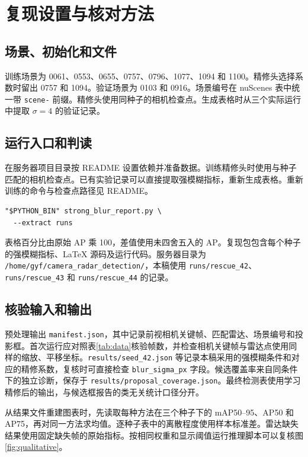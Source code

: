 \documentclass[conference,10pt,a4paper]{IEEEtran}
\begin{document}
\raggedbottom
\appendices
\section{复现设置与核对方法}
\subsection{场景、初始化和文件}
训练场景为 0061、0553、0655、0757、0796、1077、1094 和 1100。精修头选择系数时留出 0757 和 1094。验证场景为 0103 和 0916。场景编号在 nuScenes 表中统一带 \texttt{scene-} 前缀。精修头使用同种子的相机检查点。生成表格时从三个实际运行中提取 $\sigma=4$ 的验证记录。

\subsection{运行入口和判读}
在服务器项目目录按 README 设置依赖并准备数据。训练精修头时使用与种子匹配的相机检查点。已有实验记录可以直接提取强模糊指标，重新生成表格。重新训练的命令与检查点路径见 README。

\begin{small}
\begin{verbatim}
"$PYTHON_BIN" strong_blur_report.py \
  --extract runs
\end{verbatim}
\end{small}

表格百分比由原始 AP 乘 100，差值使用未四舍五入的 AP。复现包包含每个种子的强模糊指标、LaTeX 源码及运行代码。服务器目录为 \texttt{/home/gyf/}\allowbreak\texttt{camera\_radar\_detection/}，本稿使用 \texttt{runs/rescue\_42}、\texttt{runs/rescue\_43} 和 \texttt{runs/rescue\_44} 的记录。

\subsection{核验输入和输出}
预处理输出 \texttt{manifest.json}，其中记录前视相机关键帧、匹配雷达、场景编号和投影框。首次运行应对照表\ref{tab:data}核验帧数，并检查相机关键帧与雷达点使用同样的缩放、平移坐标。\texttt{results/seed\_42.json} 等记录本稿采用的强模糊条件和对应的精修系数，复核时可直接检查 \texttt{blur\_sigma\_px} 字段。候选覆盖率来自同条件下的独立诊断，保存于 \texttt{results/proposal\_coverage.json}。最终检测表使用学习精修后的输出，与候选框报告的类无关统计口径分开。

从结果文件重建图表时，先读取每种方法在三个种子下的 mAP50--95、AP50 和 AP75，再对同一方法求均值。逐种子表中的离散程度使用样本标准差。雷达缺失结果使用固定缺失帧的原始指标。按相同权重和显示阈值运行推理脚本可以复核图\ref{fig:qualitative}。
\end{document}

